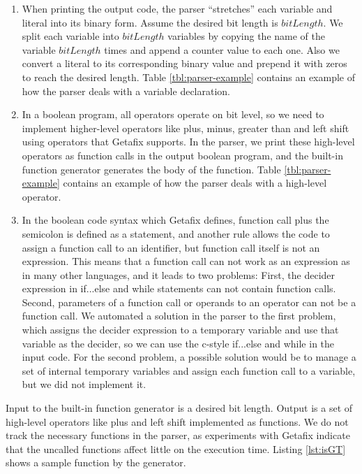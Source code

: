 \begin{enumerate}
\item When printing the output code, the parser ``stretches'' each variable and literal into its binary form. Assume the desired bit length is $bitLength$. We split each variable into $bitLength$ variables by copying the name of the variable $bitLength$ times and append a counter value to each one. Also we convert a literal to its corresponding binary value and prepend it with zeros to reach the desired length. Table \ref{tbl:parser-example} contains an example of how the parser deals with a variable declaration.
\item In a boolean program, all operators operate on bit level, so we need to implement higher-level operators like plus, minus, greater than and left shift using operators that Getafix supports. In the parser, we print these high-level operators as function calls in the output boolean program, and the built-in function generator generates the body of the function. Table \ref{tbl:parser-example} contains an example of how the parser deals with a high-level operator.
\item In the boolean code syntax which Getafix defines, function call plus the semicolon is defined as a statement, and another rule allows the code to assign a function call to an identifier, but function call itself is not an expression. This means that a function call can not work as an expression as in many other languages, and it leads to two problems: First, the decider expression in if...else and while statements can not contain function calls. Second, parameters of a function call or operands to an operator can not be a function call. We automated a solution in the parser to the first problem, which assigns the decider expression to a temporary variable and use that variable as the decider, so we can use the c-style if...else and while in the input code. For the second problem, a possible solution would be to manage a set of internal temporary variables and assign each function call to a variable, but we did not implement it.
\end{enumerate}

Input to the built-in function generator is a desired bit length. Output is a set of high-level operators like plus and left shift implemented as functions. We do not track the necessary functions in the parser, as experiments with Getafix indicate that the uncalled functions affect little on the execution time. Listing \ref{lst:isGT} shows a sample function by the generator.

